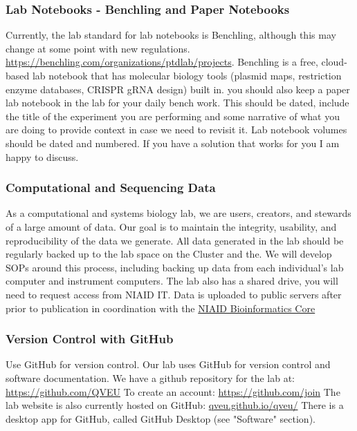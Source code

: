 \documentclass[10pt, letterpaper, twocolumn]{article} %
\begin{document}
\subsubsection{Lab Notebooks - Benchling and Paper Notebooks}
Currently, the lab standard for lab notebooks is Benchling, although this may change at some point with new regulations. \href{https://benchling.com/organizations/ptdlab/projects}{https://benchling.com/organizations/ptdlab/projects}. Benchling is a free, cloud-based lab notebook that has molecular biology tools (plasmid maps, restriction enzyme databases, CRISPR gRNA design) built in. you should also keep a paper lab notebook in the lab for your daily bench work. This should be dated, include the title of the experiment you are performing and some narrative of what you are doing to provide context in case we need to revisit it. Lab notebook volumes should be dated and numbered. If you have a solution that works for you I am happy to discuss. 

\subsubsection{Computational and Sequencing Data}
As a computational and systems biology lab, we are users, creators, and stewards of a large amount of data. Our goal is to maintain the integrity, usability, and reproducibility of the data we generate. All data generated in the lab should be regularly backed up to the lab space on the Cluster and the. We will develop SOPs around this process, including backing up data from each individual's lab computer and instrument computers. The lab also has a shared drive, you will need to request access from NIAID IT. Data is uploaded to public servers after prior to publication in coordination with the \href{https://bioinformatics.niaid.nih.gov/}{NIAID Bioinformatics Core}

\subsubsection{Version Control with GitHub}
Use GitHub for version control. Our lab uses GitHub for version control and software documentation. We have a github repository for the lab at: \href{https://github.com/QVEU}{https://github.com/QVEU}
To create an account: \href{https://github.com/join}{https://github.com/join}
The lab website is also currently hosted on GitHub: \href{https://qveu.github.io/QVEU/}{qveu.github.io/qveu/}
\newline
There is a desktop app for GitHub, called GitHub Desktop (see "Software" section).
\end{document}
